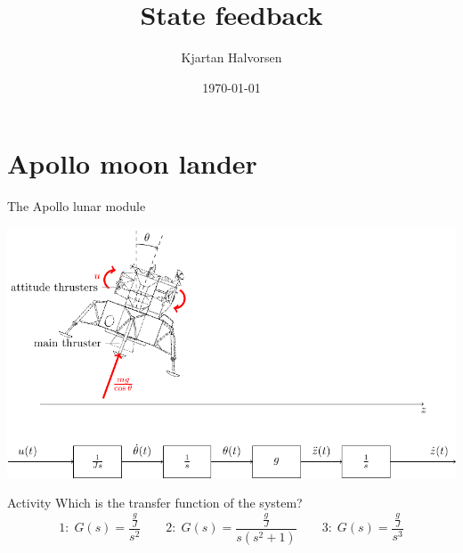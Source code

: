 \documentclass[presentation,aspectratio=169]{beamer}
\author{Kjartan Halvorsen}
\date{\today}
\title{State feedback}
\begin{document}
\maketitle



\section{Apollo moon lander}
\label{sec:orgf2ea2b4}

\begin{frame}[label={sec:org348834a}]{The Apollo lunar module}
\begin{center}
\includegraphics[width=0.7\linewidth]{../../figures/fig-apollo}
\end{center}

\pause

\alert{Activity} Which is the transfer function of the system?
   \[1: \; G(s) = \frac{\frac{g}{J} }{s^2}\qquad 2: \; G(s) = \frac{\frac{g}{J} }{s(s^2 + 1)} \qquad 3: \; G(s) = \frac{\frac{g}{J} }{s^3}\]
\end{frame}
\end{document}
